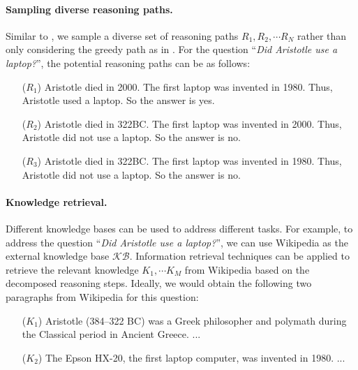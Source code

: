 \paragraph{Sampling diverse reasoning paths.} Similar to \citet{wang2022self}, we sample a diverse set of reasoning paths $R_1, R_2, \cdots R_N$ rather than only considering the greedy path as in \citet{wei2022chain}. For the question ``\textit{Did Aristotle use a laptop?}'', the potential reasoning paths can be as follows:
\begin{itemize}
    \item[($R_1$)] Aristotle died in 2000. The first laptop was invented in 1980. Thus, Aristotle used a laptop. So the answer is yes.
    \item[($R_2$)] Aristotle died in 322BC. The first laptop was invented in 2000. Thus, Aristotle did not use a laptop. So the answer is no.
    \item[($R_3$)] Aristotle died in 322BC. The first laptop was invented in 1980. Thus, Aristotle did not use a laptop. So the answer is no.
\end{itemize}

\paragraph{Knowledge retrieval.} Different knowledge bases can be used to address different tasks. For example, to address the question ``\textit{Did Aristotle use a laptop?}'', we can use Wikipedia as the external knowledge base $\mathcal{KB}$. Information retrieval techniques can be applied to retrieve the relevant knowledge $K_1, \cdots K_M$ from Wikipedia based on the decomposed reasoning steps. Ideally, we would obtain the following two paragraphs from Wikipedia for this question:
\begin{itemize}
    \item[($K_1$)] Aristotle (384–322 BC) was a Greek philosopher and polymath during the Classical period in Ancient Greece. ...
    \item[($K_2$)] The Epson HX-20, the first laptop computer, was invented in 1980. ...
\end{itemize}

